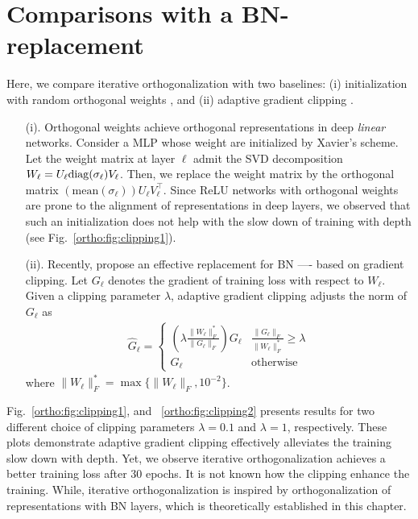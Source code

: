  \section{Comparisons with a BN-replacement}
 \label{ortho:sec:bnreplace}
 Here, we compare iterative orthogonalization with two baselines: (i) initialization with random orthogonal weights \citep{saxe2013exact}, and (ii) adaptive gradient clipping \citep{brock2021high}.
 \begin{itemize}
     \item[(i).] Orthogonal weights achieve orthogonal representations in deep \textit{linear} networks. Consider a MLP whose weight are initialized by Xavier's scheme. Let the weight matrix at layer $\ell$ admit the SVD decomposition $W_\ell = U_\ell \mathrm{diag}(\sigma_\ell) V_\ell$. Then, we replace the weight matrix by the orthogonal matrix $(\text{mean}(\sigma_\ell)) U_\ell V_\ell^\top $. Since ReLU networks with orthogonal weights are prone to the alignment of representations in deep layers, we observed that such an initialization does not help with the slow down of training with depth (see Fig.~\ref{ortho:fig:clipping1}).  
     \item[(ii).] Recently, \cite{brock2021high} propose an effective replacement for BN ---- based on gradient clipping. Let $G_\ell$ denotes the gradient of training loss with respect to $W_\ell$. Given a clipping parameter $\lambda$, adaptive gradient clipping adjusts the norm of $G_\ell$ as
     \begin{align}
         \widehat{G}_\ell = \begin{cases} 
         \left(\lambda \frac{\|W_\ell \|_F^*}{\| G_\ell \|_F}\right) G_\ell & \frac{\| G_\ell \|_F}{\| W_\ell \|_F^*} \geq \lambda \\ 
         G_\ell & \text{otherwise}
         \end{cases}
     \end{align}
     where $\| W_\ell \|_F^* = \max\{\| W_\ell \|_F, 10^{-2} \}$. 
 \end{itemize}
 Fig.~\ref{ortho:fig:clipping1}, and ~\ref{ortho:fig:clipping2} presents results for two different choice of clipping parameters $\lambda=0.1$ and $\lambda=1$, respectively. These plots demonstrate adaptive gradient clipping  effectively alleviates the training slow down with depth. Yet, we observe iterative orthogonalization achieves a better training loss after 30 epochs. 
 It is not known how the clipping enhance the training. While, iterative orthogonalization is inspired by orthogonalization of representations with BN layers, which is theoretically established in this chapter.
